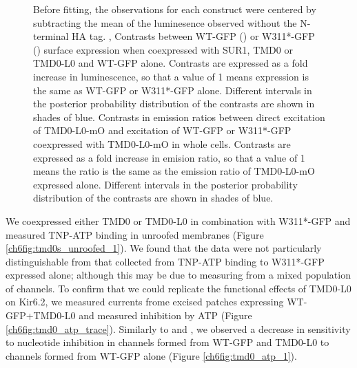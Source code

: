 \begin{figure}[h]
{	Before fitting, the observations for each construct were centered by subtracting the mean of the luminesence observed without the N-terminal HA tag.
	,  Contrasts between WT-GFP () or W311*-GFP () surface expression when coexpressed with SUR1, TMD0 or TMD0-L0 and WT-GFP alone.
	Contrasts are expressed as a fold increase in luminescence, so that a value of 1 means expression is the same as WT-GFP or W311*-GFP alone.
	Different intervals in the posterior probability distribution of the contrasts are shown in shades of blue.
	  Contrasts in emission ratios between direct excitation of TMD0-L0-mO and excitation of WT-GFP or W311*-GFP coexpressed with TMD0-L0-mO in whole cells.
	Contrasts are expressed as a fold increase in emision ratio, so that a value of 1 means the ratio is the same as the emission ratio of TMD0-L0-mO expressed alone.
	Different intervals in the posterior probability distribution of the contrasts are shown in shades of blue.
	}\label{ch6fig:tmd0_assays}
\end{figure}

We coexpressed either TMD0 or TMD0-L0 in combination with W311*-GFP and measured TNP-ATP binding in unroofed membranes (Figure \ref{ch6fig:tmd0s_unroofed_1}).
We found that the data were not particularly distinguishable from that collected from TNP-ATP binding to W311*-GFP expressed alone; although this may be due to measuring from a mixed population of channels.
To confirm that we could replicate the functional effects of TMD0-L0 on Kir6.2, we measured currents frome excised patches expressing WT-GFP+TMD0-L0 and measured inhibition by ATP (Figure \ref{ch6fig:tmd0_atp_trace}).
Similarly to \textcite{babenko_sur_2003-1} and \textcite{chan_n-terminal_2003-1}, we observed a decrease in sensitivity to nucleotide inhibition in channels formed from WT-GFP and TMD0-L0 to channels formed from WT-GFP alone (Figure \ref{ch6fig:tmd0_atp_1}).

